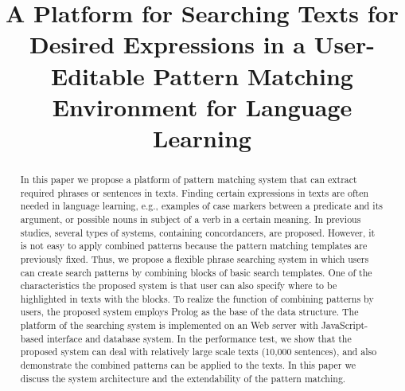 \documentclass[conference]{IEEEtran}
\begin{document}
\title{A Platform for Searching Texts for Desired Expressions in a User-Editable Pattern Matching Environment for Language Learning\\
}

\author{
\and
{}
}



\maketitle

\begin{abstract}
In this paper we propose a platform of pattern matching system that can extract required phrases or sentences in texts.
Finding certain expressions in texts are often needed in language learning, e.g., examples of case markers
between a predicate and its argument, or possible nouns in subject of a verb in a certain meaning. In previous studies,
several types of systems, containing concordancers, are proposed. However, it is not easy to apply combined
patterns because the pattern matching templates are previously fixed.
Thus, we propose a flexible phrase searching system in which users can create search patterns
by combining blocks of basic search templates. %
One of the characteristics the proposed system is that user can also specify where to be highlighted
in texts with the blocks.
To realize the function of combining patterns by users, the proposed system employs
Prolog as the base of the data structure. The platform of the searching system is implemented
on an Web server with JavaScript-based interface and database system. 
In the performance test, we show that the proposed system can deal with relatively large scale texts
(10,000 sentences), and also demonstrate the combined patterns can be applied to the texts.
In this paper we discuss the system architecture and the extendability of the pattern matching. 
\end{abstract}
\end{document}

